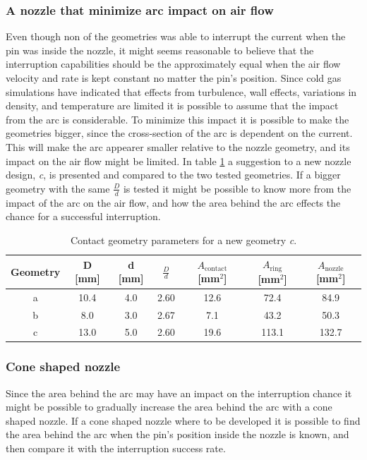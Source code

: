 \documentclass[10pt,a4paper]{article}
\begin{document}
\subsubsection{A nozzle that minimize arc impact on air flow}
Even though non of the geometries was able to interrupt the current when the pin was inside the nozzle, it might seems reasonable to believe that the interruption capabilities should be the approximately equal when the air flow velocity and rate is kept constant no matter the pin's position. Since cold gas simulations have indicated that effects from turbulence, wall effects, variations in density, and temperature are limited it is possible to assume that the impact from the arc is considerable. To minimize this impact it is possible to make the geometries bigger, since the cross-section of the arc is dependent on the current. This will make the arc appearer smaller relative to the nozzle geometry, and its impact on the air flow might be limited. In table \ref{tab:contGeoParaNew} a suggestion to a new nozzle design, \textit{c}, is presented and compared to the two tested geometries. If a bigger geometry with the same $\frac{D}{d}$ is tested it might be possible to know more from the impact of the arc on the air flow, and how the area behind the arc effects the chance for a successful interruption.

\begin{table}[H]
\center
\caption{Contact geometry parameters for a new geometry \textit{c}.}
 \begin{tabular}{|c|c|c|c|c|c|c|}
\hline 
Geometry & D [mm] & d [mm] & $\frac{D}{d}$ & $A_\mathrm{{contact}}$ [mm$^2$] & $A_\mathrm{{ring}}$ [mm$^2$] & $A_\mathrm{{nozzle}}$ [mm$^2$] \\ 
\hline 
a & 10.4 & 4.0 & 2.60 & 12.6 & 72.4 & 84.9 \\ 
\hline 
b & 8.0 & 3.0 & 2.67 & 7.1 & 43.2 & 50.3 \\ 
\hline 
c & 13.0 & 5.0 & 2.60 & 19.6 & 113.1 & 132.7 \\ 
\hline
\end{tabular} 
\label{tab:contGeoParaNew}
\end{table}

\subsubsection{Cone shaped nozzle}
Since the area behind the arc may have an impact on the interruption chance it might be possible to gradually increase the area behind the arc with a cone shaped nozzle. If a cone shaped nozzle where to be developed it is possible to find the area behind the arc when the pin's position inside the nozzle is known, and then compare it with the interruption success rate.
\end{document}
